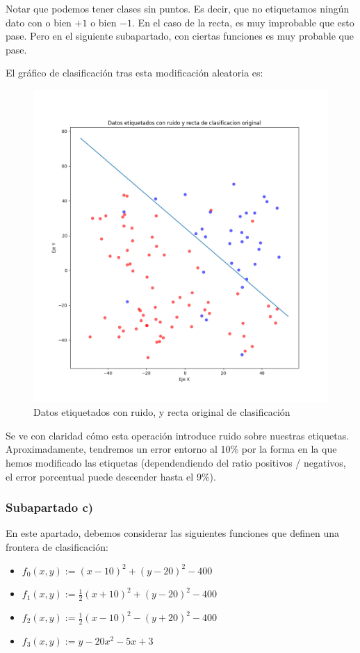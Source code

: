 \documentclass[11pt]{article}
\begin{document}
Notar que podemos tener clases sin puntos. Es decir, que no etiquetamos ningún dato con o bien $+1$ o bien $-1$. En el caso de la recta, es muy improbable que esto pase. Pero en el siguiente subapartado, con ciertas funciones es muy probable que pase.

El gráfico de clasificación tras esta modificación aleatoria es:

\begin{figure}[H]
    \centering
    \includegraphics[width = 0.8 \textwidth]{puntos_clasificados_recta_aleatorizados01}
    \caption{Datos etiquetados con ruido, y recta original de clasificación}
\end{figure}

Se ve con claridad cómo esta operación introduce ruido sobre nuestras etiquetas. Aproximadamente, tendremos un error entorno al 10\% por la forma en la que hemos modificado las etiquetas (dependendiendo del ratio positivos / negativos, el error porcentual puede descender hasta el 9\%).

\subsubsection{Subapartado c)} \label{section:apartado_obligatorio}

En este apartado, debemos considerar las siguientes funciones que definen una frontera de clasificación:

\begin{itemize}
    \item $f_0(x, y):= (x - 10)^2 + (y - 20)^2 - 400$
    \item $f_1(x, y):= \frac{1}{2} (x + 10)^2 + (y - 20)^2 - 400$
    \item $f_2(x, y):= \frac{1}{2} (x - 10)^2 - (y + 20)^2 - 400$
    \item $f_3(x, y):= y - 20x^2 -5x +3$
\end{itemize}
\end{document}
